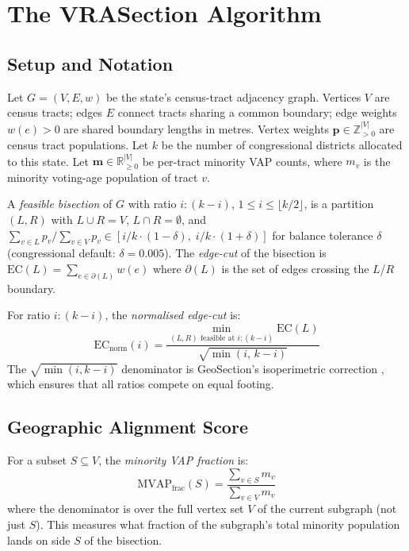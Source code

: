 \section{The VRASection Algorithm}
\label{sec:algorithm}

\subsection{Setup and Notation}

Let $G = (V, E, w)$ be the state's census-tract adjacency graph.
Vertices $V$ are census tracts; edges $E$ connect tracts sharing a common
boundary; edge weights $w(e) > 0$ are shared boundary lengths in metres.
Vertex weights $\mathbf{p} \in \mathbb{Z}_{>0}^{|V|}$ are census tract populations.
Let $k$ be the number of congressional districts allocated to this state.
Let $\mathbf{m} \in \mathbb{R}_{\geq 0}^{|V|}$ be per-tract minority VAP
counts, where $m_v$ is the minority voting-age population of tract $v$.

\begin{definition}
A \emph{feasible bisection} of $G$ with ratio $i:(k-i)$, $1 \leq i \leq \lfloor k/2 \rfloor$,
is a partition $(L, R)$ with $L \cup R = V$, $L \cap R = \emptyset$,
and $\sum_{v \in L} p_v / \sum_{v \in V} p_v \in [i/k \cdot (1-\delta),\; i/k \cdot (1+\delta)]$
for balance tolerance $\delta$ (congressional default: $\delta = 0.005$).
The \emph{edge-cut} of the bisection is $\mathrm{EC}(L) = \sum_{e \in \partial(L)} w(e)$
where $\partial(L)$ is the set of edges crossing the $L$/$R$ boundary.
\end{definition}

\begin{definition}
For ratio $i:(k-i)$, the \emph{normalised edge-cut} is:
\[
  \mathrm{EC}_\text{norm}(i) = \frac{\min_{(L,R) \text{ feasible at } i:(k-i)} \mathrm{EC}(L)}{\sqrt{\min(i,\, k-i)}}
\]
The $\sqrt{\min(i,k-i)}$ denominator is GeoSection's isoperimetric correction
\citep{b8paper}, which ensures that all ratios compete on equal footing.
\end{definition}

\subsection{Geographic Alignment Score}

\begin{definition}
For a subset $S \subseteq V$, the \emph{minority VAP fraction} is:
\[
  \mathrm{MVAP}_\text{frac}(S) = \frac{\sum_{v \in S} m_v}{\sum_{v \in V} m_v}
\]
where the denominator is over the full vertex set $V$ of the current subgraph
(not just $S$). This measures what fraction of the subgraph's total minority
population lands on side $S$ of the bisection.
\end{definition}

